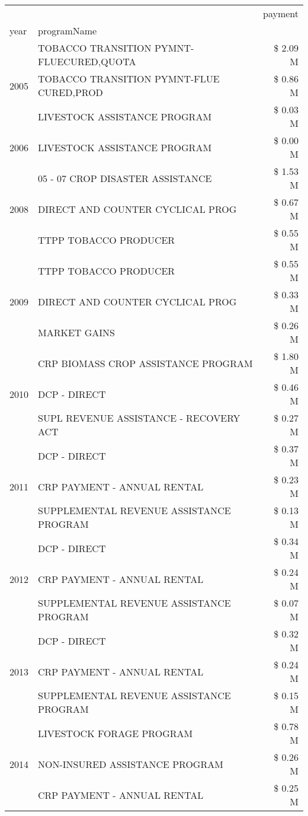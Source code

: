 \begin{tabular}{llr}
\toprule
 &  & payment \\
year & programName &  \\
\midrule
\multirow[t]{3}{*}{2005} & TOBACCO TRANSITION PYMNT-FLUECURED,QUOTA & \$ 2.09 M \\
 & TOBACCO TRANSITION PYMNT-FLUE CURED,PROD & \$ 0.86 M \\
 & LIVESTOCK ASSISTANCE PROGRAM & \$ 0.03 M \\
\cline{1-3}
2006 & LIVESTOCK ASSISTANCE PROGRAM & \$ 0.00 M \\
\cline{1-3}
\multirow[t]{3}{*}{2008} & 05 - 07 CROP DISASTER ASSISTANCE & \$ 1.53 M \\
 & DIRECT AND COUNTER CYCLICAL PROG & \$ 0.67 M \\
 & TTPP TOBACCO PRODUCER & \$ 0.55 M \\
\cline{1-3}
\multirow[t]{3}{*}{2009} & TTPP TOBACCO PRODUCER & \$ 0.55 M \\
 & DIRECT AND COUNTER CYCLICAL PROG & \$ 0.33 M \\
 & MARKET GAINS & \$ 0.26 M \\
\cline{1-3}
\multirow[t]{3}{*}{2010} & CRP BIOMASS CROP ASSISTANCE PROGRAM & \$ 1.80 M \\
 & DCP - DIRECT & \$ 0.46 M \\
 & SUPL REVENUE ASSISTANCE - RECOVERY ACT & \$ 0.27 M \\
\cline{1-3}
\multirow[t]{3}{*}{2011} & DCP - DIRECT & \$ 0.37 M \\
 & CRP PAYMENT - ANNUAL RENTAL & \$ 0.23 M \\
 & SUPPLEMENTAL REVENUE ASSISTANCE PROGRAM & \$ 0.13 M \\
\cline{1-3}
\multirow[t]{3}{*}{2012} & DCP - DIRECT & \$ 0.34 M \\
 & CRP PAYMENT - ANNUAL RENTAL & \$ 0.24 M \\
 & SUPPLEMENTAL REVENUE ASSISTANCE PROGRAM & \$ 0.07 M \\
\cline{1-3}
\multirow[t]{3}{*}{2013} & DCP - DIRECT & \$ 0.32 M \\
 & CRP PAYMENT - ANNUAL RENTAL & \$ 0.24 M \\
 & SUPPLEMENTAL REVENUE ASSISTANCE PROGRAM & \$ 0.15 M \\
\cline{1-3}
\multirow[t]{3}{*}{2014} & LIVESTOCK FORAGE PROGRAM & \$ 0.78 M \\
 & NON-INSURED ASSISTANCE PROGRAM & \$ 0.26 M \\
 & CRP PAYMENT - ANNUAL RENTAL & \$ 0.25 M \\

\end{tabular}
